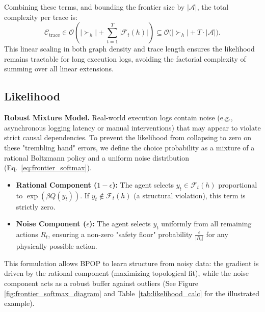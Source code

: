 \documentclass{article}
\theoremstyle{plain}
\theoremstyle{definition}
\theoremstyle{remark}
\begin{document}
Combining these terms, and bounding the frontier size by $|\mathcal{A}|$, the total complexity per trace is:
\begin{equation}
    \mathcal{C}_{\text{trace}} \in \mathcal{O}\left(|\succ_h| + \sum_{t=1}^T |\mathcal{F}_t(h)|\right) \subseteq \mathcal{O}\big(|\succ_h| + T \cdot |\mathcal{A}|\big).
    \label{eq:complexity_bound}
\end{equation}
This linear scaling in both graph density and trace length ensures the likelihood remains tractable for long execution logs, avoiding the factorial complexity of summing over all linear extensions.


\subsection{Likelihood}
\label{app:likelihood_visual}
\noindent \textbf{Robust Mixture Model.}
Real-world execution logs contain noise (e.g., asynchronous logging latency or manual interventions) that may appear to violate strict causal dependencies. To prevent the likelihood from collapsing to zero on these "trembling hand" errors, we define the choice probability as a mixture of a rational Boltzmann policy and a uniform noise distribution (Eq.~\ref{eq:frontier_softmax}).
\begin{itemize}
    \item \textbf{Rational Component ($1-\epsilon$):} The agent selects $y_t \in \mathcal{F}_t(h)$ proportional to $\exp(\beta Q(y_t))$. If $y_t \notin \mathcal{F}_t(h)$ (a structural violation), this term is strictly zero.
    \item \textbf{Noise Component ($\epsilon$):} The agent selects $y_t$ uniformly from all remaining actions $R_t$, ensuring a non-zero "safety floor" probability $\frac{\epsilon}{|R_t|}$ for any physically possible action.
\end{itemize}
This formulation allows BPOP to learn structure from noisy data: the gradient is driven by the rational component (maximizing topological fit), while the noise component acts as a robust buffer against outliers (See Figure \ref{fig:frontier_softmax_diagram} and Table~\ref{tab:likelihood_calc} for the illustrated example).
\end{document}
